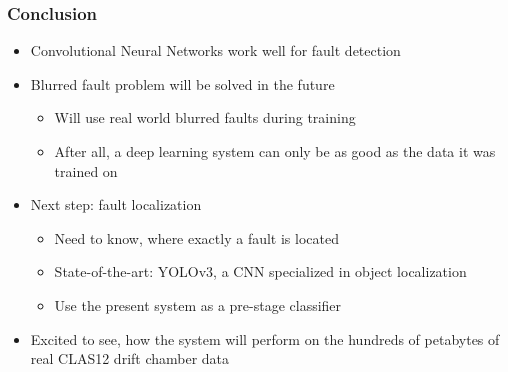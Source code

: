 \begin{frame}
  \frametitle{Conclusion}
  \begin{itemize}
    \item Convolutional Neural Networks work well for fault detection
    \item Blurred fault problem will be solved in the future
      \begin{itemize}
        \item Will use real world blurred faults during training
        \item After all, a deep learning system can only be as good as
          the data it was trained on
      \end{itemize}
    \item Next step: fault localization
      \begin{itemize}
        \item Need to know, where exactly a fault is located
        \item State-of-the-art: YOLOv3, a CNN specialized in
          object localization
        \item Use the present system as a pre-stage classifier
      \end{itemize}
    \item Excited to see, how the system will perform on the hundreds
      of petabytes of real CLAS12 drift chamber data
  \end{itemize}
\end{frame}
